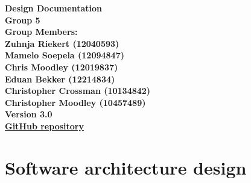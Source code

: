 \documentclass[12pt,a4paper]{article}
\begin{document}
\begin{titlepage}
\linespread{1.1} %

\newcommand{\Title}{Design Documentation} %
\newcommand{\Class}{Cos\ 301} %

	\vspace{4em}
	
	\begin{center}%
	
	  \LARGE \bf \Title \\[4em]
	  \LARGE {\bf Group 5}\\[1em]
	  \LARGE {\bf Group Members:}\\[2em]
	  \large
	     Zuhnja Riekert					(12040593) \\[1em]
	     Mamelo Soepela					(12094847) \\[1em]
	     Chris Moodley					(12019837) \\[1em]
	     Eduan Bekker					(12214834) \\[1em]
	     Christopher Crossman			(10134842) \\[1em]
	     Christopher Moodley			(10457489) \\[1em]
	     {\bf Version 3.0} \\
	    \vspace{0.5in}
	    	\LARGE\href{https://github.com/eduanb/COS301_Phase2}{GitHub repository}
	\end{center}


\end{titlepage}
\tableofcontents


\pagebreak
\section{Software architecture design}
\end{document}
